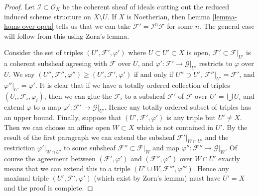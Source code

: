 \begin{proof}
Let $\mathcal{I} \subset \mathcal{O}_X$ be the coherent sheaf of ideals
cutting out the reduced induced scheme structure on $X \setminus U$.
If $X$ is Noetherian, then Lemma \ref{lemma-homs-over-open} tells us that
we can take $\mathcal{F}' = \mathcal{I}^n\mathcal{F}$
for some $n$. The general case will follow from this using Zorn's lemma.

\medskip\noindent
Consider the set of triples $(U', \mathcal{F}', \varphi')$ where
$U \subset U' \subset X$ is open, $\mathcal{F}' \subset \mathcal{F}|_{U'}$
is a coherent subsheaf agreeing with $\mathcal{F}$ over $U$, and
$\varphi' : \mathcal{F}' \to \mathcal{G}|_{U'}$ restricts to
$\varphi$ over $U$. We say
$(U'', \mathcal{F}'', \varphi'') \geq (U', \mathcal{F}', \varphi')$
if and only if $U'' \supset U'$, $\mathcal{F}''|_{U'} = \mathcal{F}'$,
and $\varphi''|_{U'} = \varphi'$.
It is clear that if we have a totally ordered collection
of triples $(U_i, \mathcal{F}_i, \varphi_i)$, then we
can glue the $\mathcal{F}_i$ to a subsheaf $\mathcal{F}'$ of $\mathcal{F}$
over $U' = \bigcup U_i$ and extend $\varphi$ to a map
$\varphi' : \mathcal{F}' \to \mathcal{G}|_{U'}$.
Hence any totally ordered subset of triples has an upper bound.
Finally, suppose that $(U', \mathcal{F}', \varphi')$
is any triple but $U' \not = X$. Then we can choose an
affine open $W \subset X$ which is not contained in $U'$.
By the result of the first paragraph we can extend
the subsheaf $\mathcal{F}'|_{W \cap U'}$ and the restriction
$\varphi'|_{W \cap U'}$ to some subsheaf $\mathcal{F}'' \subset \mathcal{F}|_W$
and map $\varphi'' : \mathcal{F}'' \to \mathcal{G}|_W$.
Of course the agreement between $(\mathcal{F}', \varphi')$ and
$(\mathcal{F}'', \varphi'')$ over $W \cap U'$ exactly means that
we can extend this to a triple $(U' \cup W, \mathcal{F}''', \varphi''')$.
Hence any maximal triple $(U', \mathcal{F}', \varphi')$
(which exist by Zorn's lemma) must have $U' = X$ and the
proof is complete.
\end{proof}









